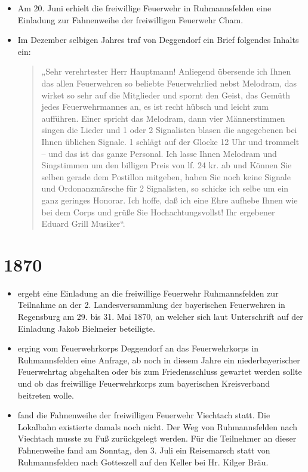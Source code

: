 \documentclass[12pt,a4paper]{book}
\begin{document}
\begin{itemize}
\item Am 20. Juni erhielt die freiwillige Feuerwehr in Ruhmannsfelden eine Einladung
zur Fahnenweihe der freiwilligen Feuerwehr Cham.

\item Im Dezember selbigen Jahres traf von Deggendorf ein Brief folgendes Inhalts ein:

\begin{quote}
„Sehr verehrtester Herr Hauptmann! Anliegend übersende ich Ihnen das allen
Feuerwehren so beliebte Feuerwehrlied nebst Melodram, das wirket so sehr auf die
Mitglieder und spornt den Geist, das Gemüth jedes Feuerwehrmannes an, es ist
recht hübsch und leicht zum aufführen. Einer spricht das Melodram, dann vier
Männerstimmen singen die Lieder und 1 oder 2 Signalisten blasen die angegebenen
bei Ihnen üblichen Signale. 1 schlägt auf der Glocke 12 Uhr und trommelt – und
das ist das ganze Personal. Ich lasse Ihnen Melodram und Singstimmen um den
billigen Preis von lf. 24 kr. ab und Können Sie selben gerade dem Postillon
mitgeben, haben Sie noch keine Signale und Ordonanzmärsche für 2 Signalisten, so
schicke ich selbe um ein ganz geringes Honorar. Ich hoffe, daß ich eine Ehre
aufhebe Ihnen wie bei dem Corps und grüße Sie Hochachtungsvollst! Ihr ergebener
Eduard Grill Musiker“.
\end{quote}
\end{itemize}

\section*{1870}

\begin{itemize}
\item ergeht eine Einladung an die freiwillige Feuerwehr Ruhmannsfelden zur
Teilnahme an der 2. Landesversammlung der bayerischen Feuerwehren in Regensburg
am 29. bis 31. Mai 1870, an welcher sich laut Unterschrift auf der Einladung Jakob
Bielmeier beteiligte.

\item erging vom Feuerwehrkorps Deggendorf an das Feuerwehrkorps in
Ruhmannsfelden eine Anfrage, ab noch in diesem Jahre ein niederbayerischer
Feuerwehrtag abgehalten oder bis zum Friedensschluss gewartet werden sollte und
ob das freiwillige Feuerwehrkorps zum bayerischen Kreisverband beitreten wolle.

\item fand die Fahnenweihe der freiwilligen Feuerwehr Viechtach statt. Die
Lokalbahn existierte damals noch nicht. Der Weg von Ruhmannsfelden nach
Viechtach musste zu Fuß zurückgelegt werden. Für die Teilnehmer an dieser
Fahnenweihe fand am Sonntag, den 3. Juli ein Reisemarsch statt von
Ruhmannsfelden nach Gotteszell auf den Keller bei Hr. Kilger Bräu.
\end{itemize}
\end{document}

